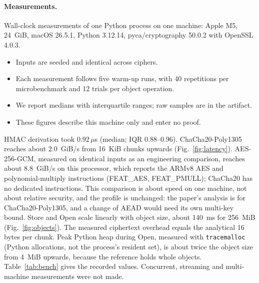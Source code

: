 \documentclass[pdflatex,sn-mathphys-num,twocolumn]{sn-jnl}
\theoremstyle{plain}
\theoremstyle{definition}
\newcommand{\code}[1]{\texttt{#1}}
\begin{document}
\paragraph{Measurements.}
Wall-clock measurements of one Python process on one machine: Apple M5, 24~GiB, macOS 26.5.1, Python 3.12.14, pyca/cryptography 50.0.2 with OpenSSL 4.0.3.
\begin{itemize}
\item Inputs are seeded and identical across ciphers.
\item Each measurement follows five warm-up runs, with 40 repetitions per microbenchmark and 12 trials per object operation.
\item We report medians with interquartile ranges; raw samples are in the artifact.
\item These figures describe this machine only and enter no proof.
\end{itemize}
HMAC derivation took $0.92\,\mu$s (median; IQR $0.88$--$0.96$). ChaCha20-Poly1305 reaches about $2.0$~GiB/s from 16~KiB chunks upwards (Fig.~\ref{fig:latency}). AES-256-GCM, measured on identical inputs as an engineering comparison, reaches about $8.8$~GiB/s on this processor, which reports the ARMv8 AES and polynomial-multiply instructions (FEAT\_AES, FEAT\_PMULL); ChaCha20 has no dedicated instructions. This comparison is about speed on one machine, not about relative security, and the profile is unchanged: the paper's analysis is for ChaCha20-Poly1305, and a change of AEAD would need its own multi-key bound. Store and Open scale linearly with object size, about 140~ms for 256~MiB (Fig.~\ref{fig:objects}). The measured ciphertext overhead equals the analytical 16 bytes per chunk. Peak Python heap during Open, measured with \code{tracemalloc} (Python allocations, not the process's resident set), is about twice the object size from 4~MiB upwards, because the reference holds whole objects. Table~\ref{tab:bench} gives the recorded values. Concurrent, streaming and multi-machine measurements were not made.
\end{document}
